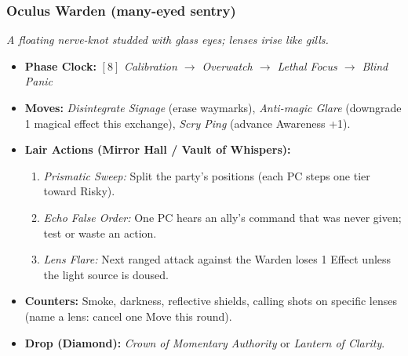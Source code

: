 \subsubsection*{Oculus Warden (many-eyed sentry)}
\textit{A floating nerve-knot studded with glass eyes; lenses irise like gills.}
\begin{itemize}
  \item \textbf{Phase Clock:} \([8]\) \emph{Calibration \(\rightarrow\) Overwatch \(\rightarrow\) Lethal Focus \(\rightarrow\) Blind Panic}
  \item \textbf{Moves:} \emph{Disintegrate Signage} (erase waymarks), \emph{Anti-magic Glare} (downgrade 1 magical effect this exchange), \emph{Scry Ping} (advance Awareness +1).
  \item \textbf{Lair Actions (Mirror Hall / Vault of Whispers):}  
  \begin{enumerate}\item \emph{Prismatic Sweep:} Split the party’s positions (each PC steps one tier toward Risky).\item \emph{Echo False Order:} One PC hears an ally’s command that was never given; test or waste an action.\item \emph{Lens Flare:} Next ranged attack against the Warden loses 1 Effect unless the light source is doused. \end{enumerate}
  \item \textbf{Counters:} Smoke, darkness, reflective shields, calling shots on specific lenses (name a lens: cancel one Move this round).
  \item \textbf{Drop (Diamond):} \emph{Crown of Momentary Authority} or \emph{Lantern of Clarity}.
\end{itemize}

